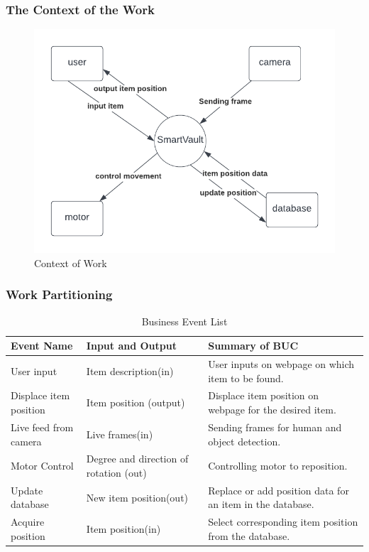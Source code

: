 \documentclass[12pt]{article}
\begin{document}
\subsubsection{The Context of the Work}
\begin{figure}[H]
    \centering
    \includegraphics[scale=0.7]{work_context.png}
    \caption{Context of Work}
\end{figure}
\subsubsection{Work Partitioning}

\begin{table}[H]
\caption{Business Event List} 
\begin{tabularx}{\textwidth}{XXX}
\toprule
\textbf{Event Name} & \textbf{Input and Output} & \textbf{Summary of BUC}\\
\midrule
User input & Item description(in) & User inputs on webpage on which item to be found.\\
Displace item position & Item position (output) & Displace item position on webpage for the desired item.\\
Live feed from camera & Live frames(in) & Sending frames for human and object detection.\\
Motor Control& Degree and direction of rotation (out) & Controlling motor to reposition.\\
Update database & New item position(out) & Replace or add position data for an item in the database.\\
Acquire position & Item position(in) & Select corresponding item position from the database.\\

\bottomrule
\end{tabularx}
\end{table}
\end{document}
